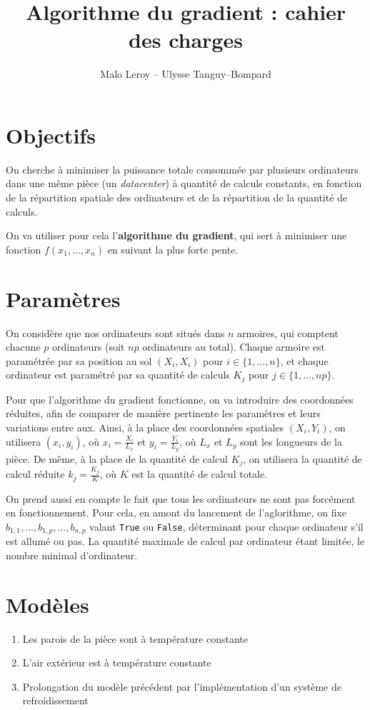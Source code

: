 \documentclass{article}
\title{Algorithme du gradient : cahier des charges}
\author{Malo Leroy -- Ulysse Tanguy--Bompard}
\newcommand{\p}{\texttt} %
\begin{document}
\maketitle

\section{Objectifs}

On cherche à minimiser la puissance totale consommée par plusieurs ordinateurs dans une même pièce (un \textit{datacenter}) à quantité de calculs constants, en fonction de la répartition spatiale des ordinateurs et de la répartition de la quantité de calculs.

On va utiliser pour cela l'\textbf{algorithme du gradient}, qui sert à minimiser une fonction $f(x_1, ..., x_n)$ en suivant la plus forte pente.

\section{Paramètres}

On considère que nos ordinateurs sont situés dans $n$ armoires, qui comptent chacune $p$ ordinateurs (soit $np$ ordinateurs au total). Chaque armoire est paramétrée par sa position au sol $(X_i, X_i)$ pour $i \in \{1, ..., n\}$, et chaque ordinateur est paramétré par sa quantité de calculs $K_j$ pour $j \in \{1, ..., np\}$.

Pour que l'algorithme du gradient fonctionne, on va introduire des coordonnées réduites, afin de comparer de manière pertinente les paramètres et leurs variations entre aux. Ainsi, à la place des coordonnées spatiales $(X_i, Y_i)$, on utilisera $(x_i, y_i)$, où $x_i = \frac{X_i}{L_x}$ et $y_i = \frac{Y_i}{L_y}$, où $L_x$ et $L_y$ sont les longueurs de la pièce. De même, à la place de la quantité de calcul $K_j$, on utilisera la quantité de calcul réduite $k_j = \frac{K_j}{K}$, où $K$ est la quantité de calcul totale.

On prend aussi en compte le fait que tous les ordinateurs ne sont pas forcément en fonctionnement. Pour cela, en amont du lancement de l'aglorithme, on fixe $b_{1,1}, ..., b_{1, p}, ..., b_{n, p}$ valant \p{True} ou \p{False}, déterminant pour chaque ordinateur s'il est allumé ou pas. La quantité maximale de calcul par ordinateur étant limitée, le nombre minimal d'ordinateur.

\section{Modèles}

\begin{enumerate}
    \item Les parois de la pièce sont à température constante
    \item L'air extérieur est à température constante
    \item Prolongation du modèle précédent par l'implémentation d'un système de refroidissement
\end{enumerate}
\end{document}
